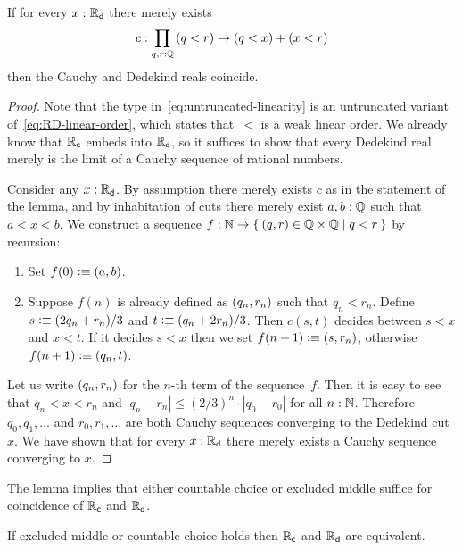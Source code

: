 \begin{lem} \label{lem:untruncated-linearity-reals-coincide}
  If for every $x : \mathbb{R}_\mathsf{d}$ there merely exists
  \begin{equation}
    \label{eq:untruncated-linearity}
    c : \prd{q, r : \Q} (q < r) \to (q < x) + (x < r)
  \end{equation}
  then the Cauchy and Dedekind reals coincide.
\end{lem}

\begin{proof}
  Note that the type in~\eqref{eq:untruncated-linearity} is an untruncated variant
  of~\eqref{eq:RD-linear-order}, which states that~$<$ is a weak linear order.
  We already know that $\mathbb{R}_\mathsf{c}$ embeds into $\mathbb{R}_\mathsf{d}$, so it suffices to show that every Dedekind
  real merely is the limit of a Cauchy sequence of rational numbers.

  Consider any $x : \mathbb{R}_\mathsf{d}$. By assumption there merely exists $c$ as in the statement of the
  lemma, and by inhabitation of cuts there merely exist $a, b : \mathbb{Q}$ such that $a < x < b$.
  We construct a sequence $f : \N \to \setof{ \pairr{q, r} \in \Q \times \Q | q < r }$ by
  recursion:
  \begin{enumerate}
  \item Set $f(0) \vcentcolon\equiv {\mathopen{}(a, b)\mathclose{}}$.
  \item Suppose $f(n)$ is already defined as ${\mathopen{}(q_n, r_n)\mathclose{}}$ such that $q_n < r_n$.
    Define $s \vcentcolon\equiv (2 q_n + r_n)/3$ and $t \vcentcolon\equiv (q_n + 2 r_n)/3$. Then $c(s,t)$
    decides between $s < x$ and $x < t$. If it decides $s < x$ then we set $f(n+1) \vcentcolon\equiv
    {\mathopen{}(s, r_n)\mathclose{}}$, otherwise $f(n+1) \vcentcolon\equiv {\mathopen{}(q_n, t)\mathclose{}}$.
  \end{enumerate}
  Let us write ${\mathopen{}(q_n, r_n)\mathclose{}}$ for the $n$-th term of the sequence~$f$. Then it is easy
  to see that $q_n < x < r_n$ and $|q_n - r_n| \leq (2/3)^n \cdot |q_0 - r_0|$ for all $n
  : \mathbb{N}$. Therefore $q_0, q_1, \ldots$ and $r_0, r_1, \ldots$ are both Cauchy sequences
  converging to the Dedekind cut~$x$. We have shown that for every $x : \mathbb{R}_\mathsf{d}$ there merely
  exists a Cauchy sequence converging to $x$.
\end{proof}

The lemma implies that either countable choice or excluded middle suffice for coincidence
of $\mathbb{R}_\mathsf{c}$ and $\mathbb{R}_\mathsf{d}$.

\begin{cor} \label{when-reals-coincide}
  If excluded middle or countable choice holds then $\mathbb{R}_\mathsf{c}$ and $\mathbb{R}_\mathsf{d}$ are equivalent.
\end{cor}


